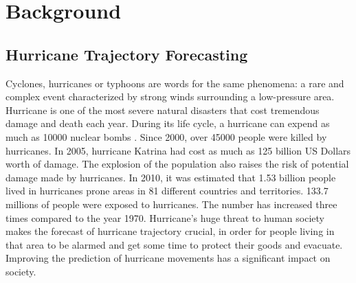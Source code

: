 \chapter{Background}
\label{sec:chapter2}

\section{Hurricane Trajectory Forecasting}
\label{sec:chapter2_1}
Cyclones, hurricanes or typhoons are words for the same phenomena: a rare and complex event characterized by strong winds surrounding a low-pressure area. Hurricane is one of the most severe natural disasters that cost tremendous damage and death each year. During its life cycle, a hurricane can expend as much as 10000 nuclear bombs \cite{hurricane_energy}. Since 2000, over 45000 people were killed by hurricanes. In 2005, hurricane Katrina had cost as much as 125 billion US Dollars worth of damage. The explosion of the population also raises the risk of potential damage made by hurricanes\cite{peduzzi2012global}. In 2010, it was estimated that 1.53 billion people lived in hurricanes prone areas in 81 different countries and territories. 133.7 millions of people were exposed to hurricanes. The number has increased three times compared to the year 1970. Hurricane's huge threat to human society makes the forecast of hurricane trajectory crucial, in order for people living in that area to be alarmed and get some time to protect their goods and evacuate. Improving the prediction of hurricane movements has a significant impact on society.



